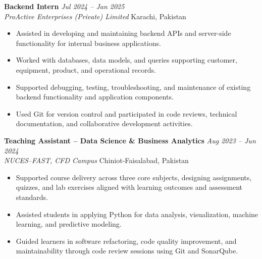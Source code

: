 \documentclass[11pt,a4paper]{article}
\newcommand{\entry}[4]{%
  \noindent\textbf{#1} \hfill \textit{#2}\\
  \textit{#3} \hfill #4\\[2pt]
}
\begin{document}
\vspace{4pt}
\entry{Backend Intern}{Jul 2024 -- Jan 2025}
      {ProActive Enterprises (Private) Limited}
      {Karachi, Pakistan}
\begin{itemize}
    \item Assisted in developing and maintaining backend APIs and
          server-side functionality for internal business applications.
    \item Worked with databases, data models, and queries supporting
          customer, equipment, product, and operational records.
    \item Supported debugging, testing, troubleshooting, and maintenance
          of existing backend functionality and application components.
    \item Used Git for version control and participated in code reviews,
          technical documentation, and collaborative development activities.
\end{itemize}

\vspace{4pt}
\entry{Teaching Assistant -- Data Science \& Business Analytics}
      {Aug 2023 -- Jun 2024}
      {NUCES--FAST, CFD Campus}
      {Chiniot-Faisalabad, Pakistan}
\begin{itemize}
    \item Supported course delivery across three core subjects, designing
          assignments, quizzes, and lab exercises aligned with learning
          outcomes and assessment standards.
    \item Assisted students in applying Python for data analysis,
          visualization, machine learning, and predictive modeling.
    \item Guided learners in software refactoring, code quality
          improvement, and maintainability through code review
          sessions using Git and SonarQube.
\end{itemize}


\end{document}
